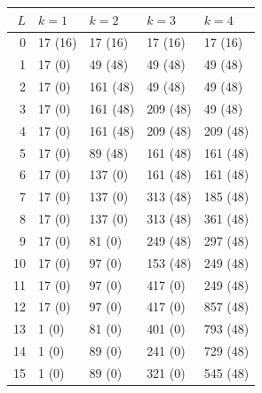 \begin{tabular}{rllll}
\toprule
$L$ & $k=1$ & $k=2$ & $k=3$ & $k=4$\\
\midrule
0 & 17 (16) & 17 (16) & 17 (16) & 17 (16)\\
1 & 17 (0) & 49 (48) & 49 (48) & 49 (48)\\
2 & 17 (0) & 161 (48) & 49 (48) & 49 (48)\\
3 & 17 (0) & 161 (48) & 209 (48) & 49 (48)\\
4 & 17 (0) & 161 (48) & 209 (48) & 209 (48)\\
5 & 17 (0) & 89 (48) & 161 (48) & 161 (48)\\
6 & 17 (0) & 137 (0) & 161 (48) & 161 (48)\\
7 & 17 (0) & 137 (0) & 313 (48) & 185 (48)\\
8 & 17 (0) & 137 (0) & 313 (48) & 361 (48)\\
9 & 17 (0) & 81 (0) & 249 (48) & 297 (48)\\
10 & 17 (0) & 97 (0) & 153 (48) & 249 (48)\\
11 & 17 (0) & 97 (0) & 417 (0) & 249 (48)\\
12 & 17 (0) & 97 (0) & 417 (0) & 857 (48)\\
13 & 1 (0) & 81 (0) & 401 (0) & 793 (48)\\
14 & 1 (0) & 89 (0) & 241 (0) & 729 (48)\\
15 & 1 (0) & 89 (0) & 321 (0) & 545 (48)\\
\bottomrule
\end{tabular}
